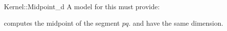 \begin{ccRefFunctionObjectConcept}{Kernel::Midpoint_d}
A model for this must provide:


 {computes the midpoint of the segment
  $pq$.\ccPrecond {} and  have the same dimension.}

\end{ccRefFunctionObjectConcept}

